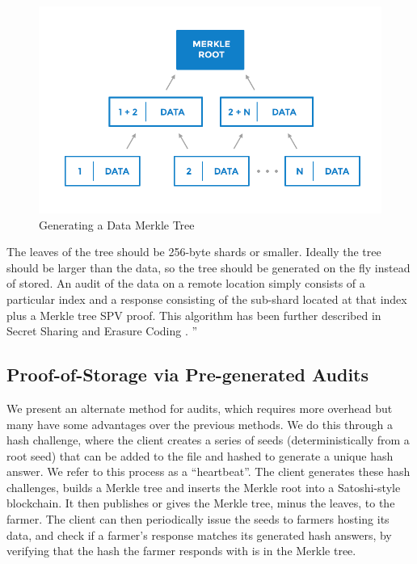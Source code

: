 \documentclass[a4paper,10pt]{article}
\begin{document}
\begin{figure}[hbt]
\centering
\includegraphics[width=\linewidth]{2}
\caption{Generating a Data Merkle Tree}
\end{figure}

 The leaves of the tree should be 256-byte shards or smaller. Ideally the tree should be larger than the data, so the tree should be generated on the fly instead of stored. An audit of the data on a remote location simply consists of a particular index and a response consisting of the sub-shard located at that index plus a Merkle tree SPV proof. This algorithm has been further described in Secret
Sharing and Erasure Coding \cite{16}. ”  \\


\subsection{Proof-of-Storage via Pre-generated Audits}
We present an alternate method for audits, which requires more overhead but many have some advantages over the previous methods. We do this through a hash challenge, where the client creates a series of seeds (deterministically from a root seed) that can be added to the file and hashed to generate a unique hash answer. We refer to this process as a “heartbeat”. The client generates these hash challenges, builds a Merkle tree \cite{2} and inserts the Merkle root into a Satoshi-style blockchain. It then publishes or gives the Merkle tree, minus the leaves, to the farmer. The client can then periodically issue the seeds to farmers hosting its data, and check if a farmer’s response matches its generated hash answers, by verifying that the hash the farmer responds with is in the Merkle tree. \\
\end{document}

